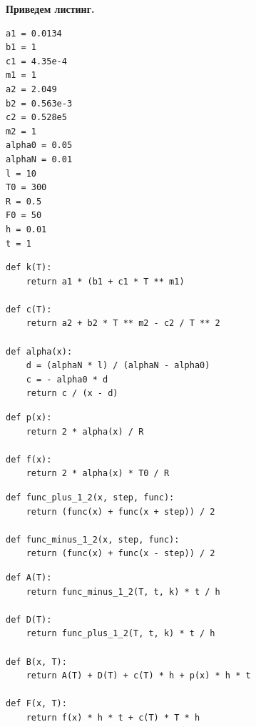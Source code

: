 \documentclass[a4paper,14pt]{extreport} %
\begin{document}
\textbf{Приведем листинг. }

\begin{lstlisting}[caption=Заданные параметры]
a1 = 0.0134
b1 = 1
c1 = 4.35e-4
m1 = 1
a2 = 2.049
b2 = 0.563e-3
c2 = 0.528e5
m2 = 1
alpha0 = 0.05
alphaN = 0.01
l = 10
T0 = 300
R = 0.5
F0 = 50
h = 0.01
t = 1
\end{lstlisting}

\begin{lstlisting}[caption=Коэффициенты теплопроводности материала стержня и теплоотдачи при обдуве; теплоемкость]
def k(T):
    return a1 * (b1 + c1 * T ** m1)

def c(T):
    return a2 + b2 * T ** m2 - c2 / T ** 2

def alpha(x):
    d = (alphaN * l) / (alphaN - alpha0)
    c = - alpha0 * d
    return c / (x - d)
\end{lstlisting}

\begin{lstlisting}[caption=Выполненные замены]
def p(x):
    return 2 * alpha(x) / R

def f(x):
    return 2 * alpha(x) * T0 / R
\end{lstlisting}

\begin{lstlisting}[caption=Метод средних для вычисления значения функций]
def func_plus_1_2(x, step, func):
    return (func(x) + func(x + step)) / 2

def func_minus_1_2(x, step, func):
    return (func(x) + func(x - step)) / 2
\end{lstlisting}

\begin{lstlisting}[caption=Функции для нахождения параметров разностной схемы]
def A(T):
    return func_minus_1_2(T, t, k) * t / h

def D(T):
    return func_plus_1_2(T, t, k) * t / h

def B(x, T):
    return A(T) + D(T) + c(T) * h + p(x) * h * t

def F(x, T):
    return f(x) * h * t + c(T) * T * h
\end{lstlisting}
\end{document}

